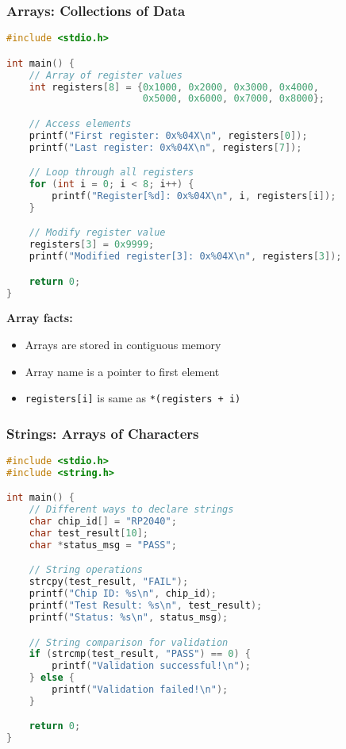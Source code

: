 \documentclass{beamer}
\begin{document}
\begin{frame}[fragile]
\frametitle{Arrays: Collections of Data}
\begin{lstlisting}[language=C]
#include <stdio.h>

int main() {
    // Array of register values
    int registers[8] = {0x1000, 0x2000, 0x3000, 0x4000,
                        0x5000, 0x6000, 0x7000, 0x8000};

    // Access elements
    printf("First register: 0x%04X\n", registers[0]);
    printf("Last register: 0x%04X\n", registers[7]);

    // Loop through all registers
    for (int i = 0; i < 8; i++) {
        printf("Register[%d]: 0x%04X\n", i, registers[i]);
    }

    // Modify register value
    registers[3] = 0x9999;
    printf("Modified register[3]: 0x%04X\n", registers[3]);

    return 0;
}
\end{lstlisting}

\textbf{Array facts:}
\begin{itemize}
    \item Arrays are stored in contiguous memory
    \item Array name is a pointer to first element
    \item \texttt{registers[i]} is same as \texttt{*(registers + i)}
\end{itemize}
\end{frame}

\begin{frame}[fragile]
\frametitle{Strings: Arrays of Characters}
\begin{lstlisting}[language=C]
#include <stdio.h>
#include <string.h>

int main() {
    // Different ways to declare strings
    char chip_id[] = "RP2040";
    char test_result[10];
    char *status_msg = "PASS";

    // String operations
    strcpy(test_result, "FAIL");
    printf("Chip ID: %s\n", chip_id);
    printf("Test Result: %s\n", test_result);
    printf("Status: %s\n", status_msg);

    // String comparison for validation
    if (strcmp(test_result, "PASS") == 0) {
        printf("Validation successful!\n");
    } else {
        printf("Validation failed!\n");
    }

    return 0;
}
\end{lstlisting}
\end{frame}
\end{document}
